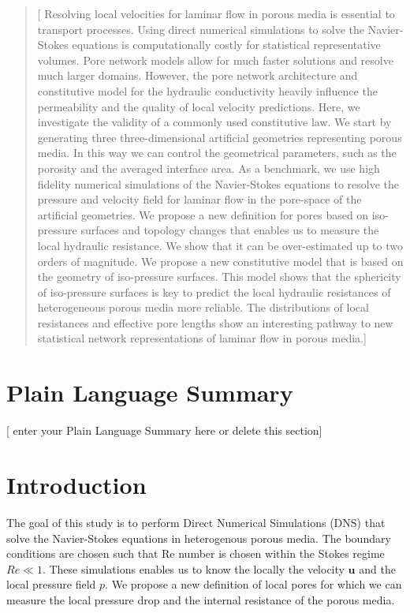 \documentclass[draft]{agujournal2019}
\begin{document}
\begin{abstract}
[ Resolving local velocities for laminar flow in porous media is essential to transport processes. Using direct numerical simulations to solve the Navier-Stokes equations is computationally costly for statistical representative volumes. Pore network models allow for much faster solutions and resolve much larger domains. However, the pore network architecture and constitutive model for the hydraulic conductivity heavily influence the permeability and the quality of local velocity predictions. Here, we investigate the validity of a commonly used constitutive law. We start by generating three three-dimensional artificial geometries representing porous media. In this way we can control the geometrical parameters, such as the porosity and the averaged interface area. As a benchmark, we use high fidelity numerical simulations of the Navier-Stokes equations to resolve the pressure and velocity field for laminar flow in the pore-space of the artificial geometries. We propose a new definition for pores based on iso-pressure surfaces and topology changes that enables us to measure the local hydraulic resistance. We show that it can be over-estimated up to two orders of magnitude. We propose a new constitutive model that is based on the geometry of iso-pressure surfaces. This model shows that the sphericity of iso-pressure surfaces is key to predict the local hydraulic resistances of heterogeneous porous media more reliable. The distributions of local resistances and effective pore lengths show an interesting pathway to new statistical network representations of laminar flow in porous media.]
\end{abstract}

\section*{Plain Language Summary}
[ enter your Plain Language Summary here or delete this section]


%
%

\section{Introduction}
The goal of this study is to perform Direct Numerical Simulations (DNS) that solve the Navier-Stokes equations in heterogenous porous media. The boundary conditions are chosen such that Re number is chosen within the Stokes regime $Re\ll1$. These simulations enables us to know the locally the velocity $\mathbf{u}$ and the local pressure field $p$. We propose a new definition of local pores for which we can measure the local pressure drop and the internal resistance of the porous media. 
\end{document}

